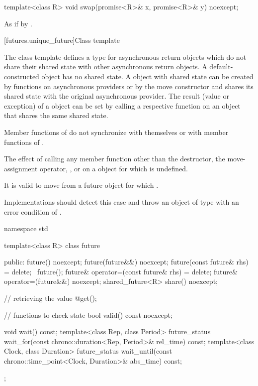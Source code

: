 %
\begin{itemdecl}
template<class R>
  void swap(promise<R>& x, promise<R>& y) noexcept;
\end{itemdecl}

\begin{itemdescr}
\pnum
\effects As if by .
\end{itemdescr}

[futures.unique_future]{Class template }

\pnum
The class template  defines a type for asynchronous return objects which
do not share their shared state with other asynchronous return objects.
A default-constructed  object has no
shared state. A  object with shared state can be created by
functions on asynchronous providers or by the move constructor
and shares its shared state with
the original asynchronous provider. The result (value or exception) of
a  object
can be
set by
calling a respective function on an
object that shares the same
shared state.

\pnum
\begin{note} Member functions of  do not synchronize with themselves or with
member functions of . \end{note}

\pnum
The effect of calling any member function other than the destructor, the
move-assignment operator, , or  on a  object for which
is undefined.
\begin{note} It is valid to move from a future object for which .
\end{note}
\begin{note} Implementations should detect this case and throw an object of type
 with an error condition of . \end{note}

%
\begin{codeblock}
namespace std {
  template<class R>
  class future {
  public:
    future() noexcept;
    future(future&&) noexcept;
    future(const future& rhs) = delete;
    ~future();
    future& operator=(const future& rhs) = delete;
    future& operator=(future&&) noexcept;
    shared_future<R> share() noexcept;

    // retrieving the value
    @\seebelow@ get();

    // functions to check state
    bool valid() const noexcept;

    void wait() const;
    template<class Rep, class Period>
      future_status wait_for(const chrono::duration<Rep, Period>& rel_time) const;
    template<class Clock, class Duration>
      future_status wait_until(const chrono::time_point<Clock, Duration>& abs_time) const;
  };
}
\end{codeblock}

